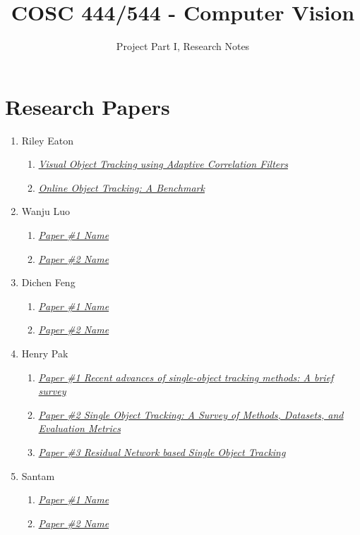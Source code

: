 \documentclass{article}
\title{COSC 444/544 - Computer Vision}
\author{Project Part I, Research Notes}
\begin{document}
\maketitle

\section*{Research Papers}

\begin{enumerate}
\item Riley Eaton
  \begin{enumerate}[label*=\arabic*.]
  \item \textit{\href{https://typeset.io/papers/visual-object-tracking-using-adaptive-correlation-filters-1xuhtpe358}{Visual Object Tracking using Adaptive Correlation Filters}}
  \item \textit{\href{https://faculty.ucmerced.edu/mhyang/papers/cvpr13_benchmark.pdf}{Online Object Tracking: A Benchmark}}
  \end{enumerate}
\item Wanju Luo
  \begin{enumerate}[label*=\arabic*.]
  \item \textit{\href{paper_link_here}{Paper \#1 Name}}
  \item \textit{\href{paper_link_here}{Paper \#2 Name}}
  \end{enumerate}
\item Dichen Feng
  \begin{enumerate}[label*=\arabic*.]
  \item \textit{\href{paper_link_here}{Paper \#1 Name}}
  \item \textit{\href{paper_link_here}{Paper \#2 Name}}
  \end{enumerate}
\item Henry Pak
  \begin{enumerate}[label*=\arabic*.]
  \item \textit{\href{https://www.sciencedirect.com/science/article/pii/S0925231221007220}{Paper \#1 Recent advances of single-object tracking methods: A brief survey}}
  \item \textit{\href{https://arxiv.org/abs/2201.13066}{Paper \#2 Single Object Tracking: A Survey of Methods, Datasets, and Evaluation Metrics}}
  \item \textit{\href{https://ieeexplore.ieee.org/document/9774086}{Paper \#3 Residual Network based Single Object Tracking}}
  \end{enumerate}
\item Santam
  \begin{enumerate}[label*=\arabic*.]
  \item \textit{\href{paper_link_here}{Paper \#1 Name}}
  \item \textit{\href{paper_link_here}{Paper \#2 Name}}
  \end{enumerate}
\end{enumerate}
\end{document}
